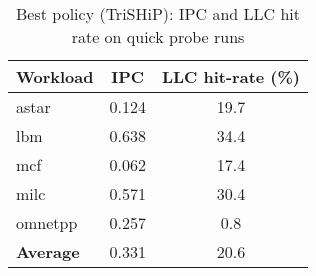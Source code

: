 \begin{table}[h]
\centering
\caption{Best policy (TriSHiP): IPC and LLC hit rate on quick probe runs}
\label{tab:best_policy_probe}
\small
\begin{tabular}{lcc}
\toprule
\textbf{Workload} & \textbf{IPC} & \textbf{LLC hit-rate (\%)} \\
\midrule
astar & 0.124 & 19.7 \\
lbm & 0.638 & 34.4 \\
mcf & 0.062 & 17.4 \\
milc & 0.571 & 30.4 \\
omnetpp & 0.257 & 0.8 \\
\midrule
\textbf{Average} & 0.331 & 20.6 \\
\bottomrule
\end{tabular}
\end{table}
